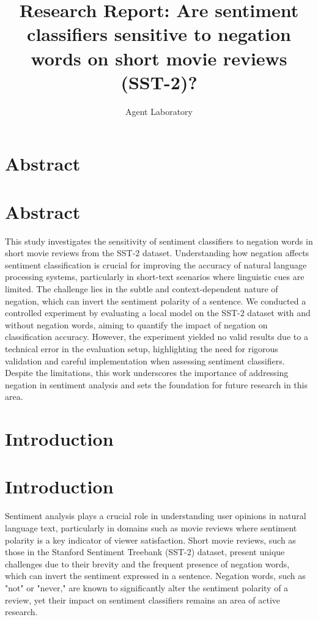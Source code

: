 \documentclass{article}
\title{Research Report: Are sentiment classifiers sensitive to negation words on short movie reviews (SST-2)?}
\author{Agent Laboratory}
\begin{document}
\maketitle
\section{Abstract}
\section*{Abstract}
This study investigates the sensitivity of sentiment classifiers to negation words in short movie reviews from the SST-2 dataset. Understanding how negation affects sentiment classification is crucial for improving the accuracy of natural language processing systems, particularly in short-text scenarios where linguistic cues are limited. The challenge lies in the subtle and context-dependent nature of negation, which can invert the sentiment polarity of a sentence. We conducted a controlled experiment by evaluating a local model on the SST-2 dataset with and without negation words, aiming to quantify the impact of negation on classification accuracy. However, the experiment yielded no valid results due to a technical error in the evaluation setup, highlighting the need for rigorous validation and careful implementation when assessing sentiment classifiers. Despite the limitations, this work underscores the importance of addressing negation in sentiment analysis and sets the foundation for future research in this area.
\section{Introduction}
\section{Introduction}

Sentiment analysis plays a crucial role in understanding user opinions in natural language text, particularly in domains such as movie reviews where sentiment polarity is a key indicator of viewer satisfaction. Short movie reviews, such as those in the Stanford Sentiment Treebank (SST-2) dataset, present unique challenges due to their brevity and the frequent presence of negation words, which can invert the sentiment expressed in a sentence. Negation words, such as "not" or "never," are known to significantly alter the sentiment polarity of a review, yet their impact on sentiment classifiers remains an area of active research.
\end{document}
